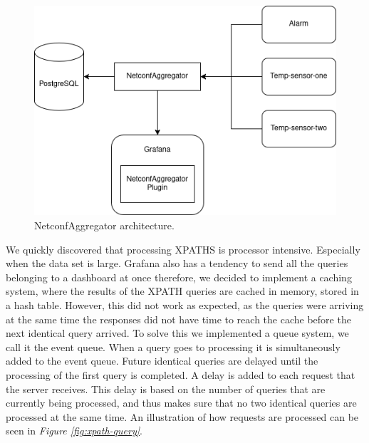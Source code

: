 \documentclass[12pt]{article}
\begin{document}
\begin{figure}
  \centering
  \includegraphics[width=\textwidth]{NetconfAggregator.png}
  \caption{NetconfAggregator architecture.}
  \label{fig:netconf-aggregator}
\end{figure}

\newpage

We quickly discovered that processing XPATHS is processor intensive. Especially when the data set is large.
Grafana also has a tendency to send all the queries belonging to a dashboard at once therefore, we decided 
to implement a caching system, where the results of the XPATH queries are cached in memory, stored in a hash table.
However, this did not work as expected, as the queries were arriving at the same time the responses did not 
have time to reach the cache before the next identical query arrived.
To solve this we implemented a queue system, we call it the event queue. 
When a query goes to processing it is simultaneously added to the event queue.
Future identical queries are delayed until the processing of the first query is completed.
A delay is added to each request that the server receives. This delay is based 
on the number of queries that are currently being processed, and thus makes
sure that no two identical queries are processed at the same time.
An illustration of how requests are processed can be seen in \textit{Figure \ref{fig:xpath-query}}.
\end{document}
